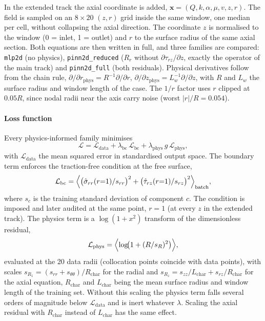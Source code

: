 \documentclass[pdflatex,sn-basic,Numbered]{sn-jnl}
\begin{document}
In the extended track the axial coordinate is added,
$\mathbf{x}=(Q,k,\alpha,\mu,v,z,r)$. The field is sampled on an $8\times20$ $(z,r)$
grid inside the same window, one median per cell, without collapsing the axial
direction. The coordinate $z$ is normalised to the window (0 = inlet, 1 = outlet) and $r$ to the
surface radius of the same axial section.
Both equations are then written in full, and three families are compared:
\texttt{mlp2d} (no physics), \texttt{pinn2d\_reduced} ($R_r$ without
$\partial\tau_{rz}/\partial z$, exactly the operator of the main track) and
\texttt{pinn2d\_full} (both residuals).
Physical derivatives follow from the chain rule,
$\partial/\partial r_{\mathrm{phys}}=R^{-1}\partial/\partial r$,
$\partial/\partial z_{\mathrm{phys}}=L_w^{-1}\partial/\partial z$, with $R$ and $L_w$
the surface radius and window length of the case. The $1/r$ factor uses $r$
clipped at $0.05R$, since nodal radii near the axis carry noise (worst
$|r|/R=0.054$).

\paragraph{Loss function}
Every physics-informed family minimises
\begin{equation}
  \mathcal{L} = \mathcal{L}_{\mathrm{data}}
              + \lambda_{\mathrm{bc}}\,\mathcal{L}_{\mathrm{bc}}
              + \lambda_{\mathrm{phys}}\,g\,\mathcal{L}_{\mathrm{phys}},
  \label{eq:loss}
\end{equation}
with $\mathcal{L}_{\mathrm{data}}$ the mean squared error in standardised output
space. The boundary term enforces the traction-free condition at the free
surface,
\begin{equation}
  \mathcal{L}_{\mathrm{bc}} = \Bigl\langle
     \bigl(\hat\sigma_{rr}(r{=}1)/s_{rr}\bigr)^2
   + \bigl(\hat\tau_{rz}(r{=}1)/s_{rz}\bigr)^2 \Bigr\rangle_{\mathrm{batch}},
  \label{eq:lbc}
\end{equation}
where $s_c$ is the training standard deviation of component $c$. The condition is
imposed and later audited at the same point, $r=1$ (at every $z$ in the extended
track). The physics term is a $\log(1+x^2)$ transform of the dimensionless
residual,
\begin{equation}
  \mathcal{L}_{\mathrm{phys}} = \Bigl\langle \log\!\bigl(1 + (R/s_R)^2\bigr) \Bigr\rangle,
  \label{eq:lphys}
\end{equation}
evaluated at the 20 data radii (collocation points coincide with data points),
with scales $s_{R_1}=(s_{rr}+s_{\theta\theta})/R_{\mathrm{char}}$ for the radial and
$s_{R_z}=s_{zz}/L_{\mathrm{char}}+s_{rz}/R_{\mathrm{char}}$ for the axial equation,
$R_{\mathrm{char}}$ and $L_{\mathrm{char}}$ being the mean surface radius and window
length of the training set.
Without this scaling the physics term falls several orders of magnitude below
$\mathcal{L}_{\mathrm{data}}$ and is inert whatever $\lambda$. Scaling the axial
residual with $R_{\mathrm{char}}$ instead of $L_{\mathrm{char}}$ has the same effect.
\end{document}
